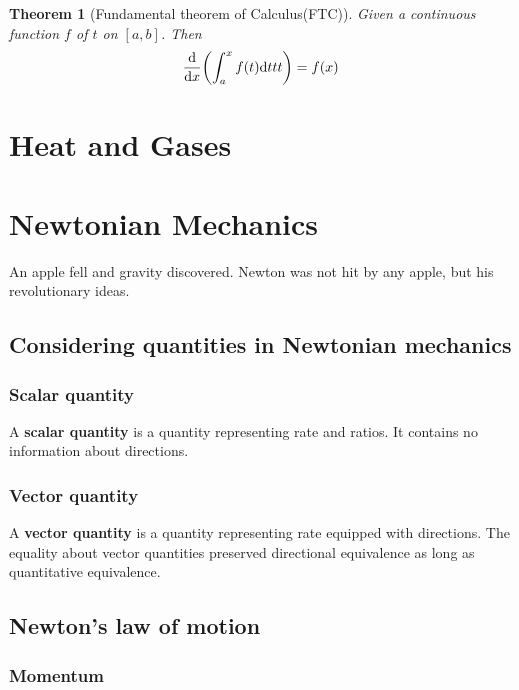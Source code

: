 \documentclass[12pt]{article}
\renewcommand{\d}[1]{\mathrm{d}{#1}}
\newtheorem*{theorem}{Theorem}
\begin{document}
    \begin{theorem}[Fundamental theorem of Calculus(FTC)]
        Given a continuous function $f$ of $t$ on $[a,b]$. Then \[\derivative{x}(\int_{a}^{x} f(t) \d{t}{t}{t}) = f(x)\]
    \end{theorem}

    \newpage
    \section{Heat and Gases}

    \newpage
    \section{Newtonian Mechanics}

    An apple fell and gravity discovered. Newton was not hit by any apple, but his revolutionary ideas.

    \subsection{Considering quantities in Newtonian mechanics}

    \subsubsection*{Scalar quantity}

    A \textbf{scalar quantity} is a quantity representing rate and ratios. It contains no information about directions.
    
    \subsubsection*{Vector quantity}

    A \textbf{vector quantity} is a quantity representing rate equipped with directions. The equality about vector quantities preserved directional equivalence as long as quantitative equivalence.

    \subsection{Newton's law of motion}

    \subsubsection*{Momentum}
\end{document}
